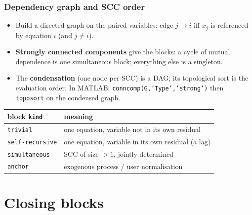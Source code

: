 \documentclass[10pt,slidestop]{beamer}
\newcommand{\code}[1]{\texttt{#1}}
\begin{document}
\begin{frame}\frametitle{Dependency graph and SCC order}
  \begin{itemize}
  \item Build a directed graph on the paired variables: edge $j \to i$ iff
    $x_j$ is referenced by equation $i$ (and $j \neq i$).\newline
  \item \textbf{Strongly connected components} give the blocks:
    a cycle of mutual dependence is one simultaneous block; everything else is a
    singleton.\newline
  \item The \textbf{condensation} (one node per SCC) is a DAG; its topological
    sort is the evaluation order. In MATLAB: \code{conncomp(G,'Type','strong')}
    then \code{toposort} on the condensed graph.
  \end{itemize}

  \smallskip
  \begin{center}\scriptsize
  \begin{tabular}{@{}ll@{}}
    \toprule
    block \code{kind} & meaning \\
    \midrule
    \code{trivial} & one equation, variable not in its own residual \\
    \code{self-recursive} & one equation, variable in its own residual (a lag) \\
    \code{simultaneous} & SCC of size $>1$, jointly determined \\
    \code{anchor} & exogenous process / user normalisation \\
    \bottomrule
  \end{tabular}
  \end{center}
\end{frame}

\section{Closing blocks}
\end{document}
